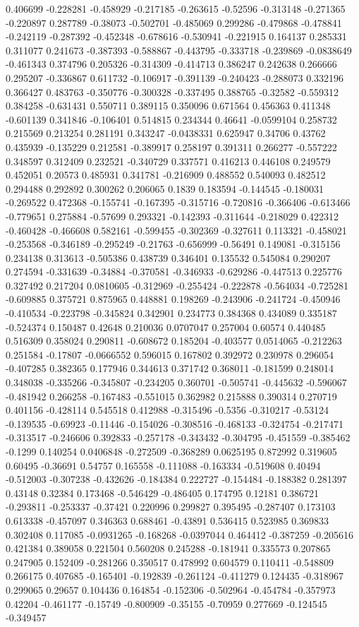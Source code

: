 0.406699 -0.228281 -0.458929 -0.217185 -0.263615 -0.52596 -0.313148 -0.271365 -0.220897 0.287789 -0.38073 -0.502701 -0.485069 0.299286 -0.479868 -0.478841 -0.242119 -0.287392 -0.452348 -0.678616 -0.530941 -0.221915 0.164137 0.285331 0.311077 0.241673 -0.387393 -0.588867 -0.443795 -0.333718 -0.239869 -0.0838649 -0.461343 0.374796 0.205326 -0.314309 -0.414713 0.386247 0.242638 0.266666 0.295207 -0.336867 0.611732 -0.106917 -0.391139 -0.240423 -0.288073 0.332196 0.366427 0.483763 -0.350776 -0.300328 -0.337495 0.388765 -0.32582 -0.559312 0.384258 -0.631431 0.550711 0.389115 0.350096 0.671564 0.456363 0.411348 -0.601139 0.341846 -0.106401 0.514815 0.234344 0.46641 -0.0599104 0.258732 0.215569 0.213254 0.281191 0.343247 -0.0438331 0.625947 0.34706 0.43762 0.435939 -0.135229 0.212581 -0.389917 0.258197 0.391311 0.266277 -0.557222 0.348597 0.312409 0.232521 -0.340729 0.337571 0.416213 0.446108 0.249579 0.452051 0.20573 0.485931 0.341781 -0.216909 0.488552 0.540093 0.482512 0.294488 0.292892 0.300262 0.206065 0.1839 0.183594 -0.144545 -0.180031 -0.269522 0.472368 -0.155741 -0.167395 -0.315716 -0.720816 -0.366406 -0.613466 -0.779651 0.275884 -0.57699 0.293321 -0.142393 -0.311644 -0.218029 0.422312 -0.460428 -0.466608 0.582161 -0.599455 -0.302369 -0.327611 0.113321 -0.458021 -0.253568 -0.346189 -0.295249 -0.21763 -0.656999 -0.56491 0.149081 -0.315156 0.234138 0.313613 -0.505386 0.438739 0.346401 0.135532 0.545084 0.290207 0.274594 -0.331639 -0.34884 -0.370581 -0.346933 -0.629286 -0.447513 0.225776 0.327492 0.217204 0.0810605 -0.312969 -0.255424 -0.222878 -0.564034 -0.725281 -0.609885 0.375721 0.875965 0.448881 0.198269 -0.243906 -0.241724 -0.450946 -0.410534 -0.223798 -0.345824 0.342901 0.234773 0.384368 0.434089 0.335187 -0.524374 0.150487 0.42648 0.210036 0.0707047 0.257004 0.60574 0.440485 0.516309 0.358024 0.290811 -0.608672 0.185204 -0.403577 0.0514065 -0.212263 0.251584 -0.17807 -0.0666552 0.596015 0.167802 0.392972 0.230978 0.296054 -0.407285 0.382365 0.177946 0.344613 0.371742 0.368011 -0.181599 0.248014 0.348038 -0.335266 -0.345807 -0.234205 0.360701 -0.505741 -0.445632 -0.596067 -0.481942 0.266258 -0.167483 -0.551015 0.362982 0.215888 0.390314 0.270719 0.401156 -0.428114 0.545518 0.412988 -0.315496 -0.5356 -0.310217 -0.53124 -0.139535 -0.69923 -0.11446 -0.154026 -0.308516 -0.468133 -0.324754 -0.217471 -0.313517 -0.246606 0.392833 -0.257178 -0.343432 -0.304795 -0.451559 -0.385462 -0.1299 0.140254 0.0406848 -0.272509 -0.368289 0.0625195 0.872992 0.319605 0.60495 -0.36691 0.54757 0.165558 -0.111088 -0.163334 -0.519608 0.40494 -0.512003 -0.307238 -0.432626 -0.184384 0.222727 -0.154484 -0.188382 0.281397 0.43148 0.32384 0.173468 -0.546429 -0.486405 0.174795 0.12181 0.386721 -0.293811 -0.253337 -0.37421 0.220996 0.299827 0.395495 -0.287407 0.173103 0.613338 -0.457097 0.346363 0.688461 -0.43891 0.536415 0.523985 0.369833 0.302408 0.117085 -0.0931265 -0.168268 -0.0397044 0.464412 -0.387259 -0.205616 0.421384 0.389058 0.221504 0.560208 0.245288 -0.181941 0.335573 0.207865 0.247905 0.152409 -0.281266 0.350517 0.478992 0.604579 0.110411 -0.548809 0.266175 0.407685 -0.165401 -0.192839 -0.261124 -0.411279 0.124435 -0.318967 0.299065 0.29657 0.104436 0.164854 -0.152306 -0.502964 -0.454784 -0.357973 0.42204 -0.461177 -0.15749 -0.800909 -0.35155 -0.70959 0.277669 -0.124545 -0.349457 